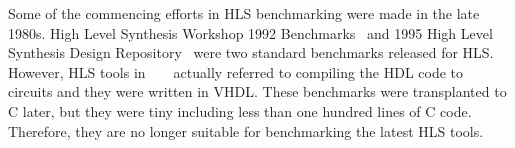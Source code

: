 \documentclass[conference]{IEEEtran}
\begin{document}



Some of the commencing efforts in HLS benchmarking were made in the late 1980s. High Level Synthesis Workshop 1992 Benchmarks~\cite{dutt1992benchmarks} and 1995 High Level Synthesis Design Repository~\cite{panda19951995} were two standard benchmarks released for HLS. However, HLS tools in ~\cite{dutt1992benchmarks} ~\cite{panda19951995} actually referred to compiling the HDL code to circuits and they were written in VHDL. These benchmarks were transplanted to C later, but they were tiny including less than one hundred lines of C code. Therefore, they are no longer suitable for benchmarking the latest HLS tools. 
\end{document}
